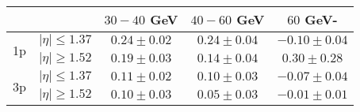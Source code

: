 \centering
\begin{tabular}{ccccc}  \toprule\toprule
                  &  & $30-40$ GeV & $40-60$ GeV & $60$ GeV-  \\ \midrule
\multirow{2}{*}{1p} &$\lvert \eta \rvert \leq 1.37$ & $0.24\pm0.02$ & $0.24\pm0.04$ & $-0.10\pm0.04$\\\cline{2-5}
                    &$\lvert \eta \rvert \geq 1.52$ & $0.19\pm0.03$ & $0.14\pm0.04$ & $0.30\pm0.28$ \\ 
\multirow{2}{*}{3p} &$\lvert \eta \rvert \leq 1.37$ & $0.11\pm0.02$ & $0.10\pm0.03$ & $-0.07\pm0.04$\\\cline{2-5}
                    &$\lvert \eta \rvert \geq 1.52$ & $0.10\pm0.03$ & $0.05\pm0.03$ & $-0.01\pm0.01$\\
\bottomrule\bottomrule
\end{tabular}